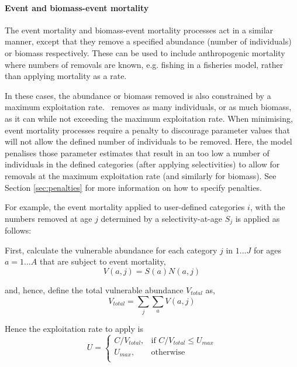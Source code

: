 \paragraph{Event and biomass-event mortality}

The event mortality and biomass-event mortality processes act in a similar manner, except that they remove a specified abundance (number of individuals) or biomass respectively. These can be used to include anthropogenic mortality where numbers of removals are known, e.g. fishing in a fisheries model, rather than applying mortality as a rate.

In these cases, the abundance or biomass removed is also constrained by a maximum exploitation rate. \CNAME\ removes as many individuals, or as much biomass, as it can while not exceeding the maximum exploitation rate. When minimising, event mortality processes require a penalty to discourage parameter values that will not allow the defined number of individuals to be removed. Here, the model penalises those parameter estimates that result in an too low a number of individuals in the defined categories (after applying selectivities) to allow for removals at the maximum exploitation rate (and similarly for biomass). See Section \ref{sec:penalties} for more information on how to specify penalties.

For example, the event mortality applied to user-defined categories $i$, with the numbers removed at age $j$ determined by a selectivity-at-age $S_j$ is applied as follows:

First, calculate the vulnerable abundance for each category $j$ in $1 \ldots J$ for ages $a = 1 \ldots A$ that are subject to event mortality,
\begin{equation}
  V(a,j) = S(a) N(a,j)
\end{equation}

and, hence, define the total vulnerable abundance $V_{total}$ as,
\begin{equation}
  V_{total}  = \sum\limits_j {\sum\limits_a {V(a,j)}}
\end{equation}

Hence the exploitation rate to apply is
\begin{equation}
U = \begin{cases}
  C/V_{total}, & \text{if $C/V_{total} \leq U_{max}$} \\
  U_{max}, & \text{otherwise}\\
  \end{cases}
\end{equation}

